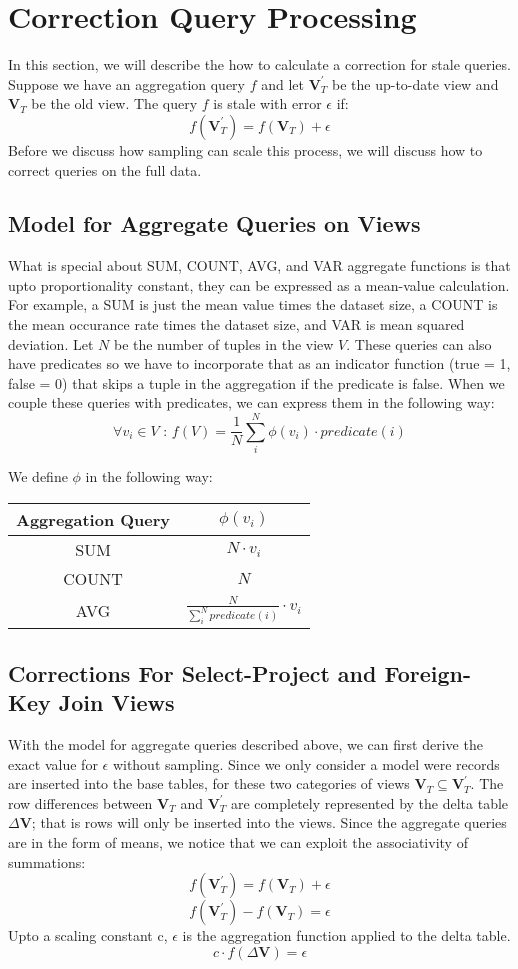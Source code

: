 \section{Correction Query Processing}
In this section, we will describe the how to calculate a 
correction for stale queries.
Suppose we have an aggregation query $f$ and let $\textbf{V}_{T}^{'}$ be the up-to-date view
and $\textbf{V}_{T}$ be the old view. 
The query $f$ is stale with error $\epsilon$ if:
\[
f(\textbf{V}_{T}^{'})=f(\textbf{V}_{T})+\epsilon
\]
Before we discuss how sampling can scale this process, we will discuss how to correct
queries on the full data.

\subsection{Model for Aggregate Queries on Views}
What is special about SUM, COUNT, AVG, and VAR aggregate functions
is that upto proportionality constant, they can be expressed as a mean-value calculation.
For example, a SUM is just the mean value times the dataset size, a COUNT 
is the mean occurance rate times the dataset size, and VAR is mean squared 
deviation.
Let $N$ be the number of tuples in the view $V$. 
These queries can also have predicates so we have to incorporate that
as an indicator function (true = 1, false = 0) that skips a tuple in the aggregation if the predicate is false. 
When we couple these queries with predicates, we can express them in the 
following way:
\[
\forall v_i \in V \text{ : } f(V)= \frac{1}{N} \sum_i^N \phi(v_i) \cdot predicate(i)
\]

We define $\phi$ in the following way:
\begin{center}
\begin{tabular}{|c|c|}
\hline 
Aggregation Query & $\phi(v_i)$\tabularnewline
\hline 
\hline 
SUM & $N \cdot v_i$\tabularnewline
\hline 
COUNT & $N$\tabularnewline
\hline 
AVG & $\frac{N}{\sum_i^N predicate(i)} \cdot v_i$\tabularnewline
\hline 
\end{tabular}
\par\end{center}

\subsection{Corrections For Select-Project and Foreign-Key Join Views}
With the model for aggregate queries described above, we can
first derive the exact value for $\epsilon$ without sampling.
Since we only consider a model were records are inserted into the
base tables, for these two categories of views $\textbf{V}_{T}\subseteq\textbf{V}_{T}^{'}$.
The row differences between $\textbf{V}_{T}$ and $\textbf{V}_{T}^{'}$
are completely represented by the delta table $\Delta\textbf{V}$;
that is rows will only be inserted into the views. 
Since the aggregate queries are in the form of means, we notice that we 
can exploit the associativity of summations:
\[
f(\textbf{V}_{T}^{'})=f(\textbf{V}_{T})+\epsilon
\]
\[
f(\textbf{V}_{T}^{'})-f(\textbf{V}_{T})=\epsilon
\]
Upto a scaling constant c, $\epsilon$ is the aggregation function
applied to the delta table. 
\[
c\cdot f(\Delta\textbf{V})=\epsilon
\]

